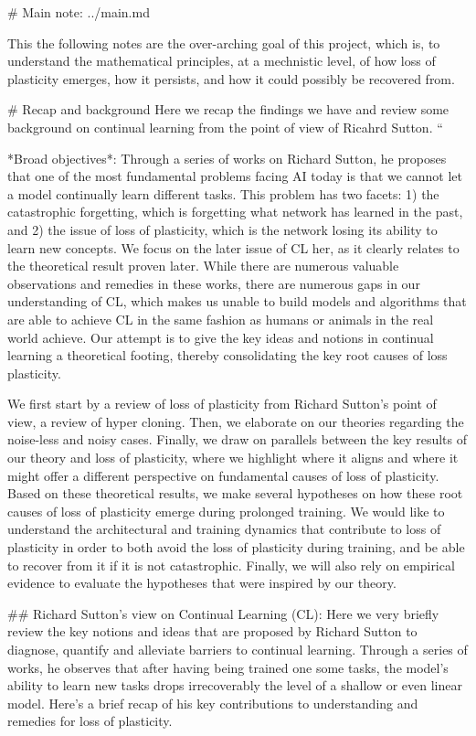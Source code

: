 # Main note: ../main.md 

This the following notes are the over-arching goal of this project, which is, to understand the mathematical principles, at a mechnistic level, of how loss of plasticity emerges, how it persists, and how it could possibly be recovered from. 


# Recap and background
Here we recap the findings we have and review some background on  continual learning from the point of view of Ricahrd Sutton. 
``

*Broad objectives*: Through a series of works on Richard Sutton, he proposes that one of the most fundamental problems facing AI today is that we cannot let a model continually learn different tasks. This problem has two facets: 1) the catastrophic forgetting, which is forgetting what network has learned in the past, and 2) the issue of loss of plasticity, which is the network losing its ability to learn new concepts. We focus on the later issue of CL her, as it clearly relates to the theoretical result proven later. While there are numerous valuable observations and remedies in these works, there are numerous gaps in our understanding of CL, which makes us unable to build models and algorithms that are able to achieve CL in the same fashion as humans or animals in the real world achieve. Our attempt is to give the key ideas and notions in continual learning a theoretical footing, thereby consolidating the key root causes of loss plasticity. 

We first start by a review of loss of plasticity from Richard Sutton’s point of view, a review of hyper cloning. Then, we elaborate on our theories regarding the noise-less and noisy cases. Finally, we draw on parallels between the key results of our theory and loss of plasticity, where we highlight where it aligns and where it might offer a different perspective on fundamental causes of loss of plasticity.  Based on these theoretical results, we make several hypotheses on how these root causes of loss of plasticity emerge during prolonged training. We would like to understand the architectural and training dynamics that contribute to loss of plasticity in order to both avoid the loss of plasticity during training, and be able to recover from it if it is not catastrophic. Finally, we will also rely on empirical evidence to evaluate the hypotheses that were inspired by our theory. 

## Richard Sutton's view on Continual Learning (CL):
 Here we very briefly review the key notions and ideas that are proposed by Richard Sutton to diagnose, quantify and alleviate barriers to continual learning. Through a series of works, he observes that after having being trained one some tasks, the model’s ability to learn new tasks drops irrecoverably the level of a shallow or even linear model.  Here’s a brief recap of his key contributions to understanding and remedies for loss of plasticity. 

